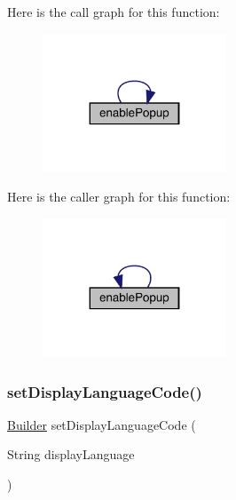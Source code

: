 Here is the call graph for this function\+:
\nopagebreak
\begin{figure}[H]
\begin{center}
\leavevmode
\includegraphics[width=155pt]{classcom_1_1toast_1_1android_1_1gamebase_1_1_gamebase_configuration_1_1_builder_a5b53589024bfbfc126c7f621ee0c2722_cgraph}
\end{center}
\end{figure}
Here is the caller graph for this function\+:
\nopagebreak
\begin{figure}[H]
\begin{center}
\leavevmode
\includegraphics[width=155pt]{classcom_1_1toast_1_1android_1_1gamebase_1_1_gamebase_configuration_1_1_builder_a5b53589024bfbfc126c7f621ee0c2722_icgraph}
\end{center}
\end{figure}
\mbox{\label{classcom_1_1toast_1_1android_1_1gamebase_1_1_gamebase_configuration_1_1_builder_a03014f0267bce586f24ebe8478982ed3}} 
\subsubsection{\texorpdfstring{set\+Display\+Language\+Code()}{setDisplayLanguageCode()}}
{\footnotesize\ttfamily \hyperlink{classcom_1_1toast_1_1android_1_1gamebase_1_1_gamebase_configuration_1_1_builder}{Builder} set\+Display\+Language\+Code (\begin{DoxyParamCaption}\item[{String}]{display\+Language }\end{DoxyParamCaption})}

